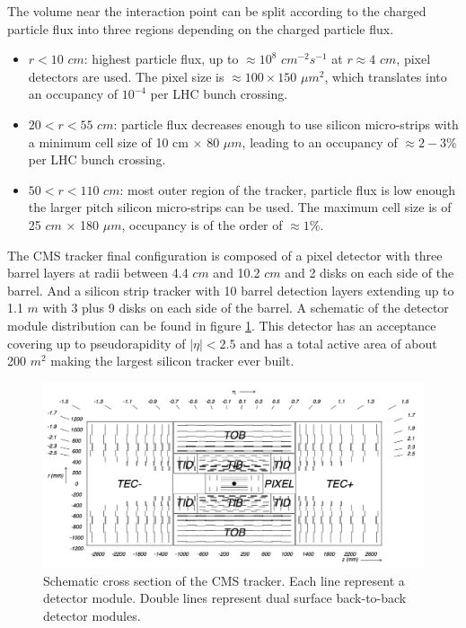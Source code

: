 The volume near the interaction point can be split according to the charged particle flux into three regions depending on the charged particle flux.

\begin{itemize}
  \item $r<10$ $cm$: highest particle flux, up to $\approx 10^8 $ $cm^{-2}s^{-1}$ at $r \approx 4$ $cm$, pixel detectors are used. The pixel size is $\approx 100 \times 150$ $\mu m^2$, which translates into an occupancy of $10^{-4}$ per \gls{LHC} bunch crossing.
  \item $20<r<55$ $cm$: particle flux decreases enough to use silicon micro-strips with a minimum cell size of 10 cm $\times$ 80 $\mu m$, leading to an occupancy of $\approx 2-3\%$ per \gls{LHC} bunch crossing.
  \item $50<r<110$ $cm$: most outer region of the tracker, particle flux is low enough the larger pitch silicon micro-strips can be used. The maximum cell size is of 25 $cm$ $\times$ 180 $\mu m$, occupancy is of the order of $\approx 1\%$.
\end{itemize}

The \gls{CMS} tracker final configuration is composed of a pixel detector with three barrel layers at radii between 4.4 $cm$ and 10.2 $cm$ and 2 disks on each side of the barrel. And a silicon strip tracker with 10 barrel detection layers extending up to 1.1 $m$ with 3 plus 9 disks on each side of the barrel. A schematic of the detector module distribution can be found in figure \ref{FIGURE:ExperimentalApparatus_CMS_Tracker_Layout}. This detector has an acceptance covering up to pseudorapidity of $|\eta|<2.5$ and has a total active area of about 200 $m^2$ making the largest silicon tracker ever built. 

\begin{figure}[!htb]
  \centering
  \includegraphics[width=1.0\textwidth]{Chapter02/CMS/Images/CMS_Tracker_Layout.png}
  \caption{Schematic cross section of the CMS tracker. Each line represent a detector module. Double lines represent dual surface back-to-back detector modules.}
  \label{FIGURE:ExperimentalApparatus_CMS_Tracker_Layout}
\end{figure}

